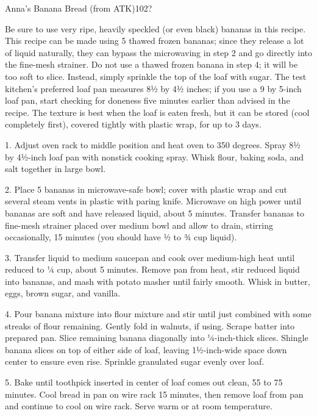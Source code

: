 \documentclass[openany]{book}
\begin{document}
\begin {recipe}{Anna’s Banana Bread (from ATK)}{10}{2?}

\freeform Be sure to use very ripe, heavily speckled (or even black) bananas in this recipe. This recipe can be made using 5 thawed frozen bananas; since they release a lot of liquid naturally, they can bypass the microwaving in step 2 and go directly into the fine-mesh strainer. Do not use a thawed frozen banana in step 4; it will be too soft to slice. Instead, simply sprinkle the top of the loaf with sugar. The test kitchen’s preferred loaf pan measures 8½ by 4½ inches; if you use a 9 by 5-inch loaf pan, start checking for doneness five minutes earlier than advised in the recipe. The texture is best when the loaf is eaten fresh, but it can be stored (cool completely first), covered tightly with plastic wrap, for up to 3 days.


1. Adjust oven rack to middle position and heat oven to 350 degrees. Spray 8½ by 4½-inch loaf pan with nonstick cooking spray. Whisk flour, baking soda, and salt together in large bowl.

2. Place 5 bananas in microwave-safe bowl; cover with plastic wrap and cut several steam vents in plastic with paring knife. Microwave on high power until bananas are soft and have released liquid, about 5 minutes. Transfer bananas to fine-mesh strainer placed over medium bowl and allow to drain, stirring occasionally, 15 minutes (you should have ½ to ¾ cup liquid).

3. Transfer liquid to medium saucepan and cook over medium-high heat until reduced to ¼ cup, about 5 minutes. Remove pan from heat, stir reduced liquid into bananas, and mash with potato masher until fairly smooth. Whisk in butter, eggs, brown sugar, and vanilla.

4. Pour banana mixture into flour mixture and stir until just combined with some streaks of flour remaining. Gently fold in walnuts, if using. Scrape batter into prepared pan. Slice remaining banana diagonally into ¼-inch-thick slices. Shingle banana slices on top of either side of loaf, leaving 1½-inch-wide space down center to ensure even rise. Sprinkle granulated sugar evenly over loaf.

5. Bake until toothpick inserted in center of loaf comes out clean, 55 to 75 minutes. Cool bread in pan on wire rack 15 minutes, then remove loaf from pan and continue to cool on wire rack. Serve warm or at room temperature.

\end {recipe}
\end{document}
